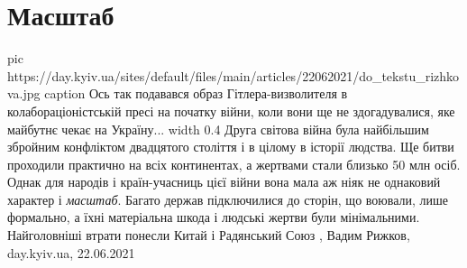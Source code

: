  
 
 
 
 
\chapter{Масштаб}

\ifcmt
  pic https://day.kyiv.ua/sites/default/files/main/articles/22062021/do_tekstu_rizhkova.jpg
	caption Ось так подавався образ Гітлера-визволителя в колабораціоністській пресі на початку війни, коли вони ще не здогадувалися, яке майбутнє чекає на Україну... 
	width 0.4
\fi
Друга світова війна була найбільшим збройним конфліктом двадцятого століття і в
цілому в історії людства. Ще битви проходили практично на всіх континентах, а
жертвами стали близько 50 млн осіб. Однак для народів і країн-учасниць цієї
війни вона мала аж ніяк не однаковий характер і \emph{масштаб}. Багато держав
підключилися до сторін, що воювали, лише формально, а їхні матеріальна шкода і
людські жертви були мінімальними. Найголовніші втрати понесли Китай і
Радянський Союз
, Вадим Рижков, day.kyiv.ua, 22.06.2021

